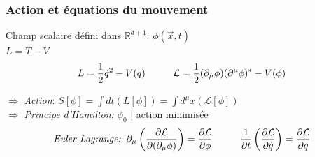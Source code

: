 \documentclass[handout]{beamer}
\begin{document}
\begin{frame}\frametitle{Action et équations du mouvement}

Champ scalaire défini dans $\mathbb{R}^{d+1}$: $\phi(\vec{x},t)$ \\[1 mm]
$L=T-V$\\[0.25 cm]

\begin{align*} L = \frac{1}{2} \dot{q}^2 -V(q) \hspace{1 cm} \mathcal{L} = \frac{1}{2} (\partial_\mu\phi)(\partial^\mu\phi)^* - V(\phi) 
\end{align*} 
\begin{block}{}
$\Rightarrow$ \textit{Action}: $S[\phi] = \int{dt (L[\phi])}  =  \int{d^{\mu}x (\mathcal{L}[\phi])}$
\\[0.25 cm]$\Rightarrow$ \textit{Principe d'Hamilton:} $\phi_0$ | action minimisée 
\begin{align*} \textit{Euler-Lagrange:}\hspace{2 mm}
\partial_\mu \left(\frac{\partial\mathcal{L}}{\partial(\partial_\mu\phi)}\right) = \frac{\partial\mathcal{L}}{\partial\phi} \hspace{1 cm}  \frac{1}{\partial t} \left(\frac{\partial\mathcal{L}}{\partial\dot{q}}\right) = \frac{\partial\mathcal{L}}{\partial q} 
\end{align*} 

\end{block}



\end{frame}
\end{document}
